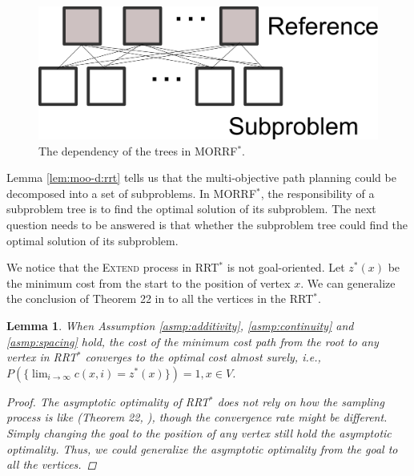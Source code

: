 \documentclass[conference]{IEEEtran}
\newtheorem{lem}{Lemma}
\begin{document}
\begin{figure}
\centering
\includegraphics[width=0.7\linewidth]{fig/dependency}
\caption{The dependency of the trees in MORRF$^{*}$.}
\label{fig:dependency}
\end{figure}

Lemma \ref{lem:moo-d:rrt} tells us that the multi-objective path planning could be decomposed into a set of subproblems.
In MORRF$^{*}$, the responsibility of a subproblem tree is to find the optimal solution of its subproblem.
The next question needs to be answered is that whether the subproblem tree could find the optimal solution of its subproblem.

We notice that the \textsc{Extend} process in RRT$^{*}$ is not goal-oriented.
Let $ z^{*}(x) $ be the minimum cost from the start to the position of vertex $ x $.
We can generalize the conclusion of Theorem 22 in \cite{Karaman.Frazzoli:RSS10} to all the vertices in the RRT$^{*}$.
\begin{lem}
\label{lem:tree_vex:conv}
When Assumption \ref{asmp:additivity}, \ref{asmp:continuity} and \ref{asmp:spacing} hold,
the cost of the minimum cost path from the root to any vertex in RRT$^{*}$ converges to the optimal cost almost surely, i.e.,
$
P( \{ \lim_{ i \rightarrow \infty } c(x, i)  = z^{*}(x) \} ) = 1, x \in V $.
\begin{proof}
The asymptotic optimality of RRT$^{*}$ does not rely on how the sampling process is like (Theorem 22, \cite{Karaman.Frazzoli:RSS10}), though the convergence rate might be different.
Simply changing the goal to the position of any vertex still hold the asymptotic optimality.
Thus, we could generalize the asymptotic optimality from the goal to all the vertices.
\end{proof}
\end{lem}
\end{document}

